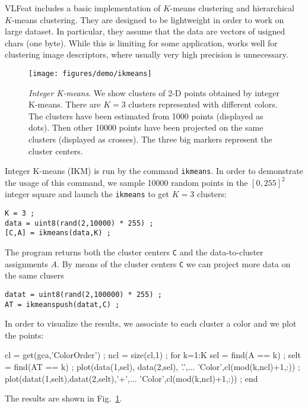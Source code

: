 \documentclass[9pt]{article}
\newcommand{\VLFeat}{{\sc VLFeat}\xspace}
\newcommand{\cmd}  [1]{{\color{red}\tt   #1}}
\begin{document}
\VLFeat includes a basic implementation of $K$-means clustering and
hierarchical $K$-means clustering. They are designed to be lightweight
in order to work on large dataset. In particular, they assume that the
data are vectors of usigned chars (one byte). While this is limiting
for some application, works well for clustering image descriptors,
where usually very high precision is unnecessary.

\begin{figure}
\begin{center}
\texttt{[image: figures/demo/ikmeans]}\\
\end{center}
\caption{{\em Integer K-means}. We show clusters of 2-D points
  obtained by integer K-means.  There are $K=3$ clusters represented
  with different colors. The clusters have been estimated from 1000
  points (displayed as dots). Then other 10000 points have been
  projected on the same clusters (displayed as crosses). The three big
  markers represent the cluster centers.}
\label{fig:ikmeans}
\end{figure}

Integer K-means (IKM) is run by the command \cmd{ikmeans}. In order to
demonstrate the usage of this command, we sample 10000 random points
in the $[0,255]^2$ integer square and launch the \cmd{ikmeans} to get
$K=3$ clusters:
\begin{verbatim}
K = 3 ;
data = uint8(rand(2,10000) * 255) ;
[C,A] = ikmeans(data,K) ;
\end{verbatim}
The program returns both the cluster centers \verb$C$ and the
data-to-cluster assignments $A$. By means of the cluster centers
\verb$C$ we can project more data on the same clusers
\begin{verbatim}
datat = uint8(rand(2,100000) * 255) ;
AT = ikmeanspush(datat,C) ;
\end{verbatim}
In order to visualize the results, we associate to each cluster a
color and we plot the points:
\begin{verbcode}
cl = get(gca,'ColorOrder') ;
ncl = size(cl,1) ;
for k=1:K
  sel  = find(A  == k) ;
  selt = find(AT == k) ;
  plot(data(1,sel),  data(2,sel),  '.',...
       'Color',cl(mod(k,ncl)+1,:)) ;
  plot(datat(1,selt),datat(2,selt),'+',...
       'Color',cl(mod(k,ncl)+1,:)) ;  
end
\end{verbcode}
The results are shown in Fig.~\ref{fig:ikmeans}.


\end{document}
